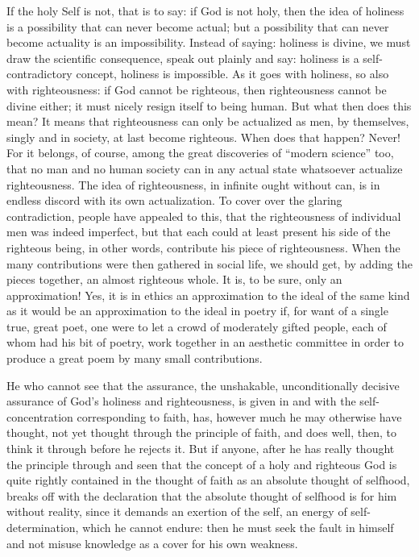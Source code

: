 \documentclass[12pt]{book}
\newcommand{\opage}[1]{\marginnote{\footnotesize\textit{[#1]}}}
\begin{document}
If the holy Self is not, that is to say: if God is not holy, then the
idea of holiness is a possibility that can never become actual; but a
possibility that can never become actuality is an impossibility. Instead
of saying: holiness is divine, we must draw the scientific consequence,
speak out plainly and say: holiness is a self-contradictory concept,
holiness is impossible. As it goes with holiness, so also with
righteousness: if God cannot be righteous, then righteousness cannot be
divine either; it must nicely resign itself to being human. But what
then does this mean? It means that righteousness can only be actualized
as men, by themselves, singly and in society, at last become righteous.
When does that happen? Never! For it belongs, of course, among the
great discoveries of ``modern science'' too, that no man and no human
society can in any actual state whatsoever actualize righteousness.
\opage{114}\setcounter{footnote}{0}%
The idea of righteousness, in infinite ought without can, is in endless
discord with its own actualization. To cover over the glaring
contradiction, people have appealed to this, that the righteousness of
individual men was indeed imperfect, but that each could at least
present his side of the righteous being, in other words, contribute his
piece of righteousness. When the many contributions were then gathered
in social life, we should get, by adding the pieces together, an almost
righteous whole. It is, to be sure, only an approximation! Yes, it is in
ethics an approximation to the ideal of the same kind as it would be an
approximation to the ideal in poetry if, for want of a single true,
great poet, one were to let a crowd of moderately gifted people, each of
whom had his bit of poetry, work together in an aesthetic committee in
order to produce a great poem by many small contributions.

He who cannot see that the assurance, the unshakable, unconditionally
decisive assurance of God's holiness and righteousness, is given in and
with the self-concentration corresponding to faith, has, however much he
may otherwise have thought, not yet thought through the principle of
faith, and does well, then, to think it through before he rejects it.
But if anyone, after he has really thought the principle through and
seen that the concept of a holy and righteous God is quite rightly
contained in the thought of faith as an absolute thought of selfhood,
breaks off with the declaration that the absolute thought of selfhood is
for him without reality, since it demands an exertion of the self, an
energy of self-determination, which he cannot endure: then he must seek
the fault in himself and not misuse knowledge as a cover for his own
weakness.
\end{document}
